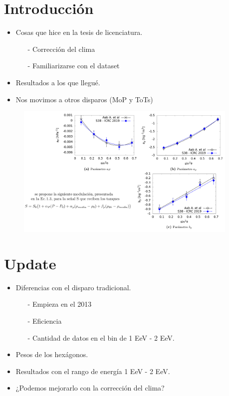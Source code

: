 \section{Introducción}


\begin{itemize}
  \item Cosas que hice en la tesis de licenciatura.
  \begin{itemize}
  	\item[-] Corrección del clima
  	\item[-] Familiarizarse con el dataset
  \end{itemize}
  \item Resultados a los que llegué.
  \item Nos movimos a otros disparos (MoP y ToTs)
\end{itemize}

 


\begin{figure}[htbp]
  \centering
  \includegraphics[width=0.95\textwidth]{../beamer-07-05-2020/tesis.png}
\end{figure}

 

\section{Update}


  \begin{itemize}
  	\item Diferencias con el disparo tradicional.
    \begin{itemize}
      \item[-] Empieza en el 2013
      \item[-] Eficiencia
      \item[-] Cantidad de datos en el bin de 1 EeV - 2 EeV.
    \end{itemize}
  	\item Pesos de los hexágonos.
  	\item Resultados con el rango de energía 1 EeV - 2 EeV.
    \item ¿Podemos mejorarlo con la corrección del clima?
  \end{itemize}


